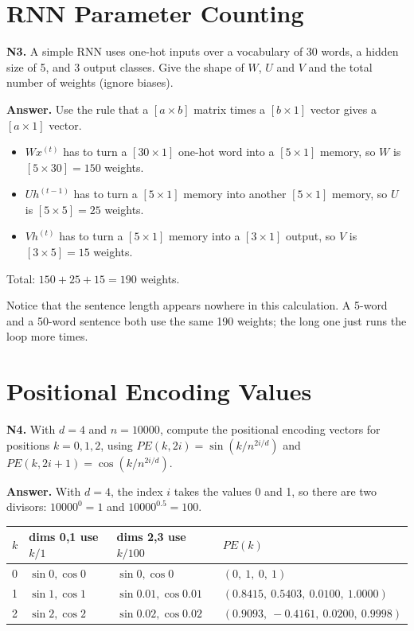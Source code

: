 \documentclass[11pt]{article}
\begin{document}
\section{RNN Parameter Counting}

\textbf{N3.} A simple RNN uses one-hot inputs over a vocabulary of 30 words, a hidden size of
5, and 3 output classes. Give the shape of $W$, $U$ and $V$ and the total number of weights
(ignore biases).

\textbf{Answer.} Use the rule that a $[a\times b]$ matrix times a $[b\times 1]$ vector gives a
$[a\times 1]$ vector.

\begin{itemize}
  \item $Wx^{(t)}$ has to turn a $[30\times1]$ one-hot word into a $[5\times1]$ memory, so $W$ is $[5\times30]=150$ weights.
  \item $Uh^{(t-1)}$ has to turn a $[5\times1]$ memory into another $[5\times1]$ memory, so $U$ is $[5\times5]=25$ weights.
  \item $Vh^{(t)}$ has to turn a $[5\times1]$ memory into a $[3\times1]$ output, so $V$ is $[3\times5]=15$ weights.
\end{itemize}

Total: $150+25+15=190$ weights.

Notice that the sentence length appears nowhere in this calculation. A 5-word and a 50-word
sentence both use the same 190 weights; the long one just runs the loop more times.

\section{Positional Encoding Values}

\textbf{N4.} With $d=4$ and $n=10000$, compute the positional encoding vectors for positions
$k=0,1,2$, using $PE(k,2i)=\sin\!\left(k/n^{2i/d}\right)$ and
$PE(k,2i+1)=\cos\!\left(k/n^{2i/d}\right)$.

\textbf{Answer.} With $d=4$, the index $i$ takes the values 0 and 1, so there are two
divisors: $10000^{0}=1$ and $10000^{0.5}=100$.

\begin{tabular}{llll}
\hline
$k$ & dims 0,1 use $k/1$ & dims 2,3 use $k/100$ & $PE(k)$ \\
\hline
0 & $\sin 0,\cos 0$ & $\sin 0,\cos 0$ & $(0,\ 1,\ 0,\ 1)$ \\
1 & $\sin 1,\cos 1$ & $\sin 0.01,\cos 0.01$ & $(0.8415,\ 0.5403,\ 0.0100,\ 1.0000)$ \\
2 & $\sin 2,\cos 2$ & $\sin 0.02,\cos 0.02$ & $(0.9093,\ -0.4161,\ 0.0200,\ 0.9998)$ \\
\hline
\end{tabular}
\end{document}
